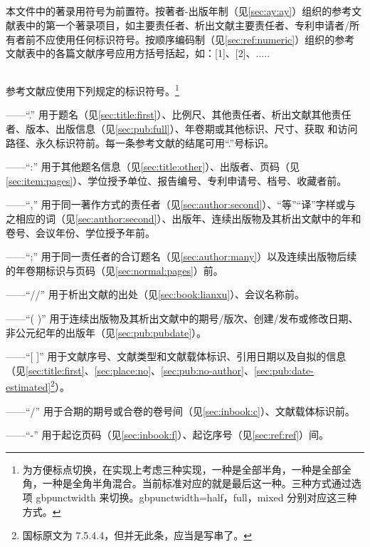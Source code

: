 \documentclass[twoside]{article}%
\begin{document}
{
\renewcommand\addcontentsline[3]{}
\subsection{} 本文件中的著录用符号为前置符。按著者-出版年制（见\ref{sec:ay:ay}）组织的参考文献表中的第一个著录项目，如主要责任者、析出文献主要责任者、专利申请者/所有者前不应使用任何标识符号。按顺序编码制（见\ref{sec:ref:numeric}）组织的参考文献表中的各篇文献序号应用方括号括起，如：[1]、[2]、.....


\subsection{} 参考文献应使用下列规定的标识符号。\footnote{为方便标点切换，在实现上考虑三种实现，一种是全部半角，一种是全部全角，一种是全角半角混合。当前标准对应的就是最后这一种。三种方式通过选项 gbpunctwidth 来切换。gbpunctwidth=half，full，mixed 分别对应这三种方式。}

——“.” 用于题名（见\ref{sec:title:first}）、比例尺、其他责任者、析出文献其他责任者、版本、出版信息（见\ref{sec:pub:full}）、年卷期或其他标识、尺寸、获取
和访问路径、永久标识符前。每一条参考文献的结尾可用“.”号标识。

——“:” 用于其他题名信息（见\ref{sec:title:other}）、出版者、页码（见\ref{sec:item:pages}）、学位授予单位、报告编号、专利申请号、档号、收藏者前。

——“,” 用于同一著作方式的责任者（见\ref{sec:author:second}）、“等”“译”字样或与之相应的词（见\ref{sec:author:second}）、出版年、连续出版物及其析出文献中的年和卷号、会议年份、学位授予年前。

——“;” 用于同一责任者的合订题名（见\ref{sec:author:many}）以及连续出版物后续的年卷期标识与页码（见\ref{sec:normal:pages}）前。

——“//” 用于析出文献的出处（见\ref{sec:book:lianxu}）、会议名称前。

——“( )” 用于连续出版物及其析出文献中的期号/版次、创建/发布或修改日期、非公元纪年的出版年（见\ref{sec:pub:pubdate}）。

——“[ ]” 用于文献序号、文献类型和文献载体标识、引用日期以及自拟的信息（见\ref{sec:title:first}、\ref{sec:place:no}、\ref{sec:pub:no-author}、\ref{sec:pub:date-estimated}\footnote{国标原文为 7.5.4.4，但并无此条，应当是写串了。}）。

——“/” 用于合期的期号或合卷的卷号间（见\ref{sec:inbook:c}）、文献载体标识前。

——“-” 用于起讫页码（见\ref{sec:inbook:f}）、起讫序号（见\ref{sec:ref:ref}）间。


}
\end{document}
